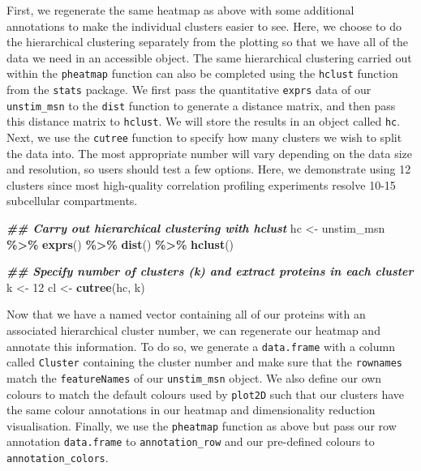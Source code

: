 \documentclass[9pt,a4paper,]{extarticle}
\newenvironment{Shaded}{\begin{snugshade}}{\end{snugshade}}
\newcommand{\DecValTok}[1]{\textcolor[rgb]{0.00,0.00,0.81}{#1}}
\newcommand{\DocumentationTok}[1]{\textcolor[rgb]{0.56,0.35,0.01}{\textbf{\textit{#1}}}}
\newcommand{\FunctionTok}[1]{\textcolor[rgb]{0.13,0.29,0.53}{\textbf{#1}}}
\newcommand{\NormalTok}[1]{#1}
\newcommand{\OtherTok}[1]{\textcolor[rgb]{0.56,0.35,0.01}{#1}}
\newcommand{\SpecialCharTok}[1]{\textcolor[rgb]{0.81,0.36,0.00}{\textbf{#1}}}
\begin{document}
First, we regenerate the same heatmap as above with some additional annotations
to make the individual clusters easier to see. Here, we choose to do the
hierarchical clustering separately from the plotting so that we have all of the
data we need in an accessible object. The same hierarchical clustering carried
out within the \texttt{pheatmap} function can also be completed using the \texttt{hclust}
function from the \texttt{stats} package. We first pass the quantitative \texttt{exprs} data
of our \texttt{unstim\_msn} to the \texttt{dist} function to generate a distance matrix, and
then pass this distance matrix to \texttt{hclust}. We will store the results in an
object called \texttt{hc}. Next, we use the \texttt{cutree} function to specify how many
clusters we wish to split the data into. The most appropriate number will vary
depending on the data size and resolution, so users should test a few options.
Here, we demonstrate using 12 clusters since most high-quality correlation
profiling experiments resolve 10-15 subcellular compartments.

\begin{Shaded}
\begin{Highlighting}[]
\DocumentationTok{\#\# Carry out hierarchical clustering with hclust}
\NormalTok{hc }\OtherTok{\textless{}{-}}\NormalTok{ unstim\_msn }\SpecialCharTok{\%\textgreater{}\%}
  \FunctionTok{exprs}\NormalTok{() }\SpecialCharTok{\%\textgreater{}\%}
  \FunctionTok{dist}\NormalTok{() }\SpecialCharTok{\%\textgreater{}\%}
  \FunctionTok{hclust}\NormalTok{()}

\DocumentationTok{\#\# Specify number of clusters (k) and extract proteins in each cluster}
\NormalTok{k }\OtherTok{\textless{}{-}} \DecValTok{12}
\NormalTok{cl }\OtherTok{\textless{}{-}} \FunctionTok{cutree}\NormalTok{(hc, k)}
\end{Highlighting}
\end{Shaded}

Now that we have a named vector containing all of our proteins with an associated
hierarchical cluster number, we can regenerate our heatmap and annotate this
information. To do so, we generate a \texttt{data.frame} with a column called \texttt{Cluster}
containing the cluster number and make sure that the \texttt{rownames} match the
\texttt{featureNames} of our \texttt{unstim\_msn} object. We also define our own colours to
match the default colours used by \texttt{plot2D} such that our clusters have the same
colour annotations in our heatmap and dimensionality reduction visualisation.
Finally, we use the \texttt{pheatmap} function as above but pass our row annotation
\texttt{data.frame} to \texttt{annotation\_row} and our pre-defined colours to \texttt{annotation\_colors}.
\end{document}
